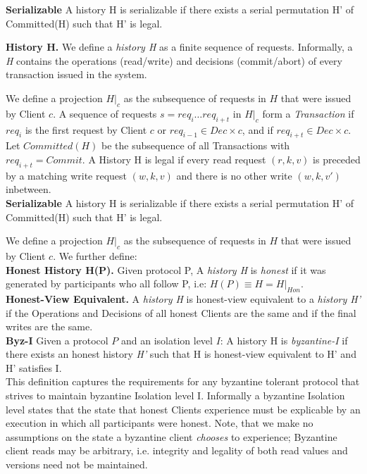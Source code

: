 \textbf{Serializable} 
A history H is serializable if there exists a serial permutation H' of Committed(H) such that H' is legal.



\textbf{History H.} We define a \textit{history H} as a finite sequence of requests. Informally, a \textit{H} contains the operations (read/write) and decisions (commit/abort) of every transaction issued in the system.

We define a projection $H|_c$ as the subsequence of requests in $H$ that were issued by Client $c$. A sequence of requests $s = req_i \dots req_{i+t}$ in $H|_c$ form a \textit{Transaction} if $req_i$ is the first request by Client $c$ or $req_{i-1} \in Dec \times c$, and if $req_{i+t} \in Dec \times c$. Let $Committed(H)$ be the subsequence of all Transactions with $req_{i+t} = Commit$. A History H is legal if every read request $(r, k, v)$ is preceded by a matching write request $(w, k, v)$ and there is no other write $(w, k, v')$ inbetween.\\
\textbf{Serializable}  
A history H is serializable if there exists a serial permutation H' of Committed(H) such that H' is legal.


We define a projection $H|_c$ as the subsequence of requests in $H$ that were issued by Client $c$.
We further define:\\
\textbf{Honest History H(P).} Given protocol P, A \textit{history H} is \textit{honest} if it was generated by participants who all follow P, i.e: $H(P) \equiv H = H|_{Hon}$.\\
\textbf{Honest-View Equivalent.} A \textit{history H} is honest-view equivalent to a \textit{history H'} if the Operations and Decisions of all honest Clients are the same and if the final writes are the same.\\
\textbf{Byz-I} Given a protocol $P$ and an isolation level $I$:
A history H is \textit{byzantine-I} if there exists an honest history \textit{H'} such that H is honest-view equivalent to H' and H' satisfies I. \\

This definition captures the requirements for any byzantine tolerant protocol that strives to maintain byzantine Isolation level I.
Informally a byzantine Isolation level states that the state that honest Clients experience must be explicable by an execution in which all participants were honest. Note, that we make no assumptions on the state a byzantine client \textit{chooses} to experience; Byzantine client reads may be arbitrary, i.e. integrity and legality of both read values and versions need not be maintained. \\

